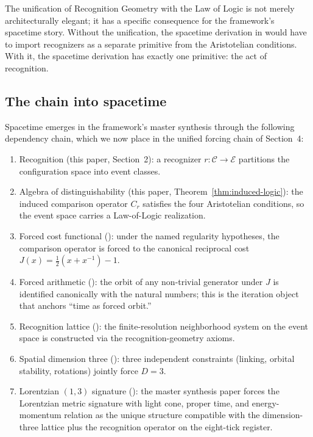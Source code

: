\documentclass[11pt,a4paper]{article}
\theoremstyle{definition}
\theoremstyle{remark}
\begin{document}
The unification of Recognition Geometry with the Law of Logic is
not merely architecturally elegant; it has a specific consequence
for the framework's spacetime story. Without the unification, the
spacetime derivation in \cite{Washburn2026RealityFromOneDistinction}
would have to import recognizers as a separate primitive from the
Aristotelian conditions. With it, the spacetime derivation has
exactly one primitive: the act of recognition.

\subsection{The chain into spacetime}

Spacetime emerges in the framework's master synthesis through the
following dependency chain, which we now place in the unified
forcing chain of Section~4:

\begin{enumerate}[leftmargin=1.6em, label=(\arabic*)]
\item Recognition (this paper, Section~2): a recognizer $r :
\mathcal{C} \to \mathcal{E}$ partitions the configuration space into
event classes.
\item Algebra of distinguishability (this paper,
Theorem~\ref{thm:induced-logic}): the induced comparison operator
$C_r$ satisfies the four Aristotelian conditions, so the event space
carries a Law-of-Logic realization.
\item Forced cost functional (\cite{Washburn2026LogicFE}): under the
named regularity hypotheses, the comparison operator is forced to
the canonical reciprocal cost $J(x) = \tfrac{1}{2}(x + x^{-1}) - 1$.
\item Forced arithmetic (\cite{Washburn2026Arithmetic}): the orbit
of any non-trivial generator under $J$ is identified canonically with
the natural numbers; this is the iteration object that anchors
``time as forced orbit.''
\item Recognition lattice
(\cite{WashburnZlatanovicAllahyarov2026Axioms}): the finite-resolution
neighborhood system on the event space is constructed via the
recognition-geometry axioms.
\item Spatial dimension three
(\cite{PardoGuerraThapaWashburnAllahyarov2026}): three independent
constraints (linking, orbital stability, rotations) jointly force
$D = 3$.
\item Lorentzian $(1, 3)$ signature
(\cite{Washburn2026RealityFromOneDistinction}): the master synthesis
paper forces the Lorentzian metric signature with light cone, proper
time, and energy-momentum relation as the unique structure
compatible with the dimension-three lattice plus the recognition
operator on the eight-tick register.
\end{enumerate}
\end{document}
